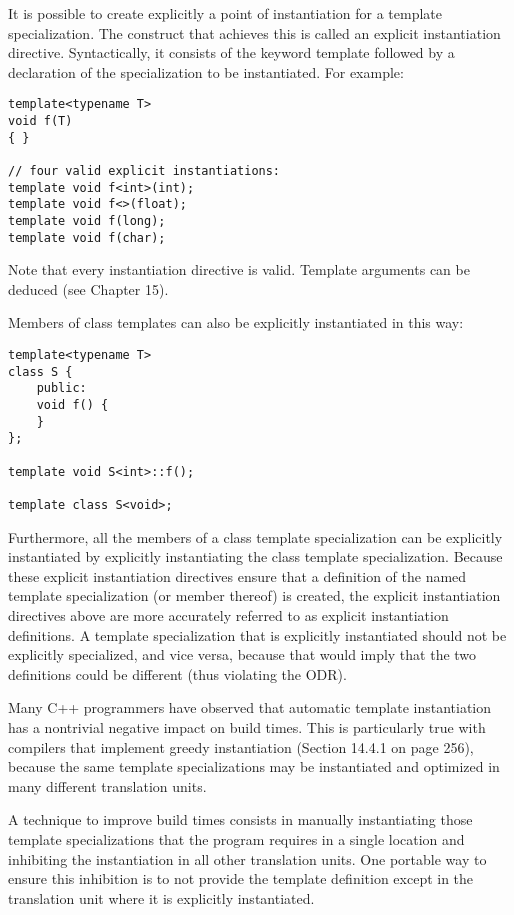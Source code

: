 
It is possible to create explicitly a point of instantiation for a template specialization. The construct that achieves this is called an explicit instantiation directive. Syntactically, it consists of the keyword template followed by a declaration of the specialization to be instantiated. For example:

\begin{lstlisting}[style=styleCXX]
template<typename T>
void f(T)
{ }

// four valid explicit instantiations:
template void f<int>(int);
template void f<>(float);
template void f(long);
template void f(char);
\end{lstlisting}

Note that every instantiation directive is valid. Template arguments can be deduced (see Chapter 15).

Members of class templates can also be explicitly instantiated in this way:

\begin{lstlisting}[style=styleCXX]
template<typename T>
class S {
	public:
	void f() {
	}
};

template void S<int>::f();

template class S<void>;
\end{lstlisting}

Furthermore, all the members of a class template specialization can be explicitly instantiated by explicitly instantiating the class template specialization. Because these explicit instantiation directives ensure that a definition of the named template specialization (or member thereof) is created, the explicit instantiation directives above are more accurately referred to as explicit instantiation definitions. A template specialization that is explicitly instantiated should not be explicitly specialized, and vice versa, because that would imply that the two definitions could be different (thus violating the ODR).


Many C++ programmers have observed that automatic template instantiation has a nontrivial negative impact on build times. This is particularly true with compilers that implement greedy instantiation (Section 14.4.1 on page 256), because the same template specializations may be instantiated and optimized in many different translation units.

A technique to improve build times consists in manually instantiating those template specializations that the program requires in a single location and inhibiting the instantiation in all other translation units. One portable way to ensure this inhibition is to not provide the template definition except in the translation unit where it is explicitly instantiated.

